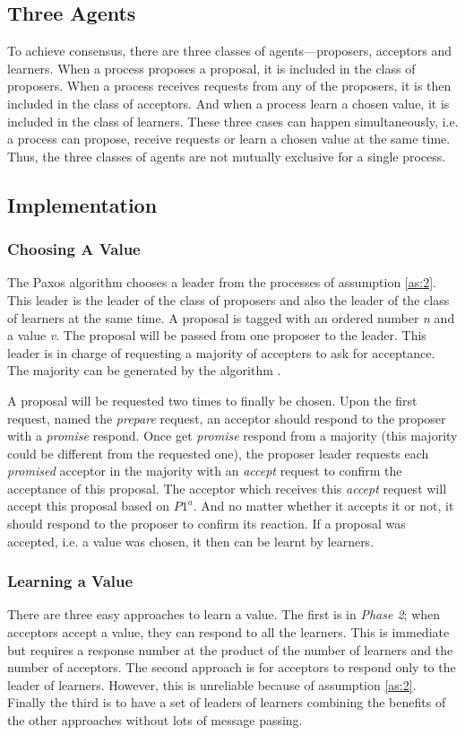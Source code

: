 \documentclass[12pt, a4paper]{article}
\begin{document}
\subsection{Three Agents}
To achieve consensus, there are three classes of agents---proposers, acceptors and learners.
When a process proposes a proposal, it is included in the class of proposers.
When a process receives requests from any of the proposers,
it is then included in the class of acceptors.
And when a process learn a chosen value, it is included in the class of learners.
These three cases can happen simultaneously, i.e.
a process can propose, receive requests or learn a chosen value at the same time.
Thus, the three classes of agents are not mutually exclusive for a single process.

\subsection{Implementation}

\subsubsection{Choosing A Value} \label{Choosing}
The Paxos algorithm \cite{lamport1998part} chooses a leader
from the processes of assumption \ref{as:2}.
This leader is the leader of the class of proposers and
also the leader of the class of learners at the same time.
A proposal is tagged with an ordered number \textit{n} and a value \textit{v}.
The proposal will be passed from one proposer to the leader.
This leader is in charge of requesting a majority of accepters to ask for acceptance.
The majority can be generated by the algorithm \cite{keidar2001cost}.

A proposal will be requested two times to finally be chosen.
Upon the first request, named the \textit{prepare} request,
an acceptor should respond to the proposer with a \textit{promise} respond.
Once get \textit{promise} respond from a majority
(this majority could be different from the requested one),
the proposer leader requests each \textit{promised} acceptor in the majority
with an \textit{accept} request to confirm the acceptance of this proposal.
The acceptor which receives this \textit{accept} request will
accept this proposal based on $P1^a$. And no matter whether it accepts it or not,
it should respond to the proposer to confirm its reaction.
If a proposal was accepted, i.e. a value was chosen, it then can be learnt by learners.

\subsubsection{Learning a Value}
There are three easy approaches to learn a value.
The first is in \textit{Phase 2}; when acceptors accept a value,
they can respond to all the learners.
This is immediate but requires a response number at
the product of the number of learners and the number of acceptors.
The second approach is for acceptors to respond only to the leader of learners.
However, this is unreliable because of assumption \ref{as:2}.
Finally the third is to have a set of leaders of learners
combining the benefits of the other approaches without lots of message passing.
\end{document}
